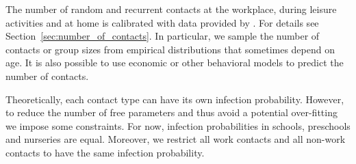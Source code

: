 The number of random and recurrent contacts at the workplace, during leisure activities
and at home is calibrated with data provided by \citet{Mossong2008}. For details see
Section~\ref{sec:number_of_contacts}. In particular, we sample the number of contacts or
group sizes from empirical distributions that sometimes depend on age. It is also
possible to use economic or other behavioral models to predict the number of contacts.

Theoretically, each contact type can have its own infection probability. However, to
reduce the number of free parameters and thus avoid a potential over-fitting we impose
some constraints. For now, infection probabilities in schools, preschools and nurseries
are equal. Moreover, we restrict all work contacts and all non-work contacts to have
the same infection probability.
